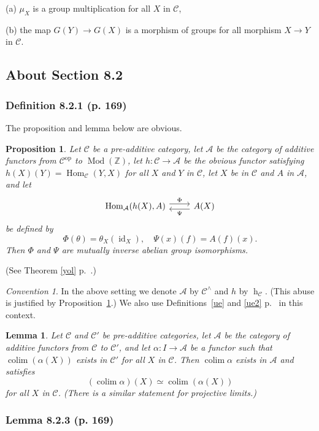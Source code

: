 \documentclass[12pt]{article}
\newtheorem{lem}[thm]{Lemma}
\newtheorem{prop}[thm]{Proposition}
\theoremstyle{remark}
\newtheorem{conv}[thm]{Convention}
\theoremstyle{definition}
\newcommand{\nn}{\noindent}
\newcommand{\bb}{\mathbb}
\newcommand{\A}{\mathcal A}
\newcommand{\C}{\mathcal C}
\DeclareMathOperator*{\colim}{colim}
\DeclareMathOperator{\hy}{h}
\DeclareMathOperator{\id}{id}
\DeclareMathOperator{\Hom}{Hom}
\DeclareMathOperator{\Mod}{Mod}
\DeclareMathOperator{\op}{op}
\begin{document}
\nn(a) $\mu_X$ is a group multiplication for all $X$ in $\C$, 

\nn(b) the map $G(Y)\to G(X)$ is a morphism of groups for all morphism $X\to Y$ in $\C$. 


\subsection{About Section 8.2}

\subsubsection{Definition 8.2.1 (p. 169)}

The proposition and lemma below are obvious. 
%
\begin{prop}\label{payp}
Let $\C$ be a pre-additive category, let $\A$ be the category of additive functors from $\C^{\op}$ to $\Mod(\bb Z)$, let $h:\C\to\A$ be the obvious functor satisfying $h(X)(Y)=\Hom_\C(Y,X)$ for all $X$ and $Y$ in $\C$, let $X$ be in $\C$ and $A$ in $\A$, and let 
$$
\begin{tikzcd}
\Hom_\A(h(X),A)\ar[yshift=.7ex]{r}{\Phi}&A(X)\ar[yshift=-.7ex]{l}{\Psi}
\end{tikzcd}
$$
be defined by 
$$
\Phi(\theta)=\theta_X(\id_X),\quad\Psi(x)(f)=A(f)(x).
$$
Then $\Phi$ and $\Psi$ are mutually inverse abelian group isomorphisms.
\end{prop}
%
\nn(See Theorem \ref{yol} p.~\pageref{yol}.)

\begin{conv}\label{payc}
In the above setting we denote $\A$ by $\C^\wedge$ and $h$ by $\hy_\C$. (This abuse is justified by Proposition~\ref{payp}.) We also use Definitions~\ref{ue} and \ref{ue2} p.~\pageref{ue} in this context. 
\end{conv} 

\begin{lem}\label{payl}
Let $\C$ and $\C'$ be pre-additive categories, let $\A$ be the category of additive functors from $\C$ to $\C'$, and let $\alpha:I\to\A$ be a functor such that $\colim(\alpha(X))$ exists in $\C'$ for all $X$ in $\C$. Then $\colim\alpha$ exists in $\A$ and satisfies 
$$
(\colim\alpha)(X)\simeq\colim(\alpha(X))
$$ 
for all $X$ in $\C$. (There is a similar statement for projective limits.)
\end{lem}


\subsubsection{Lemma 8.2.3 (p. 169)}
\end{document}
